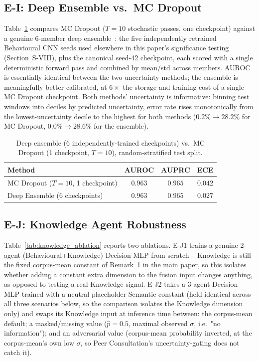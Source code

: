\documentclass[journal]{IEEEtran}
\begin{document}
\subsection{E-I: Deep Ensemble vs.\ MC Dropout}

Table~\ref{tab:deep_ensemble} compares MC Dropout ($T{=}10$ stochastic
passes, one checkpoint) against a genuine 6-member deep
ensemble~\cite{lakshminarayanan_simple_2017}: the five independently
retrained Behavioural CNN seeds used elsewhere in this paper's
significance testing (Section~S-VIII), plus the canonical seed-42
checkpoint, each scored with a single deterministic forward pass and
combined by mean/std across members. AUROC is essentially identical
between the two uncertainty methods; the ensemble is meaningfully better
calibrated, at $6\times$ the storage and training cost of a single MC
Dropout checkpoint. Both methods' uncertainty is informative: binning
test windows into deciles by predicted uncertainty, error rate rises
monotonically from the lowest-uncertainty decile to the highest for both
methods ($0.2\%\to28.2\%$ for MC Dropout, $0.0\%\to28.6\%$ for the
ensemble).

\begin{table}[h]
\centering
\footnotesize
\caption{Deep ensemble (6 independently-trained checkpoints) vs.\ MC
  Dropout (1 checkpoint, $T{=}10$), random-stratified test split.}
\label{tab:deep_ensemble}
\setlength{\tabcolsep}{4pt}
\begin{tabular}{lccc}
\toprule
Method & AUROC & AUPRC & ECE \\
\midrule
MC Dropout ($T{=}10$, 1 checkpoint) & $0.963$ & $0.965$ & $0.042$ \\
Deep Ensemble (6 checkpoints)       & $0.963$ & $0.965$ & $\mathbf{0.027}$ \\
\bottomrule
\end{tabular}
\end{table}

\subsection{E-J: Knowledge Agent Robustness}

Table~\ref{tab:knowledge_ablation} reports two ablations. E-J1 trains a
genuine 2-agent (Behavioural+Knowledge) Decision MLP from scratch --
Knowledge is still the fixed corpus-mean constant of Remark~1 in the main
paper, so this isolates whether adding a constant extra dimension to the
fusion input changes anything, as opposed to testing a real Knowledge
signal. E-J2 takes a 3-agent Decision MLP trained with a neutral
placeholder Semantic constant (held identical across all three scenarios
below, so the comparison isolates the Knowledge dimension only) and swaps
its Knowledge input at inference time between: the corpus-mean default;
a masked/missing value ($\hat p{=}0.5$, maximal observed $\sigma$, i.e.\
"no information"); and an adversarial value (corpus-mean probability
inverted, at the corpus-mean's own low $\sigma$, so Peer Consultation's
uncertainty-gating does not catch it).
\end{document}
